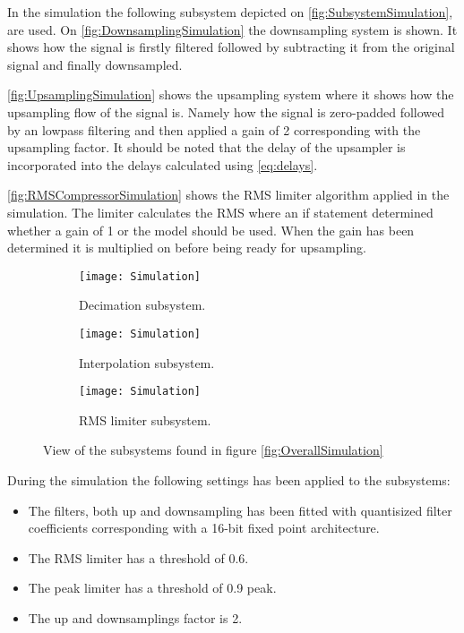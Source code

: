 In the simulation the following subsystem depicted on \autoref{fig:SubsystemSimulation}, are used. On \autoref{fig:DownsamplingSimulation} the downsampling system is shown. It shows how the signal is firstly filtered followed by subtracting it from the original signal and finally downsampled. 

\autoref{fig:UpsamplingSimulation} shows the upsampling system where it shows how the upsampling flow of the signal is. Namely how the signal is zero-padded followed by an lowpass filtering and then applied a gain of 2 corresponding with the upsampling factor. It should be noted that the delay of the upsampler is incorporated into the delays calculated using \autoref{eq:delays}.  

\autoref{fig:RMSCompressorSimulation} shows the RMS limiter algorithm applied in the simulation. The limiter calculates the RMS where an if statement determined whether a gain of 1 or the model should be used. When the gain has been determined it is multiplied on before being ready for upsampling. 
\begin{figure}[H]
\centering
\begin{subfigure}[t]{0.49\textwidth}
    \centering
\texttt{[image: Simulation]}
    \caption{Decimation subsystem.}
    \label{fig:DownsamplingSimulation}
\end{subfigure}
\begin{subfigure}[t]{0.49\textwidth}
    \centering
\texttt{[image: Simulation]}
    \caption{Interpolation subsystem.}
    \label{fig:UpsamplingSimulation}
\end{subfigure}
\begin{subfigure}[t]{\textwidth}
    \centering
\texttt{[image: Simulation]}
    \caption{RMS limiter subsystem.}
    \label{fig:RMSCompressorSimulation}
\end{subfigure}
\caption{View of the subsystems found in figure \ref{fig:OverallSimulation}}
\label{fig:SubsystemSimulation}
\end{figure}


During the simulation the following settings has been applied to the subsystems:
\begin{itemize}
\item The filters, both up and downsampling has been fitted with quantisized filter coefficients corresponding with a 16-bit fixed point architecture.
\item The RMS limiter has a threshold of 0.6. 
\item The peak limiter has a threshold of 0.9 peak.
\item The up and downsamplings factor is 2.
\end{itemize}

